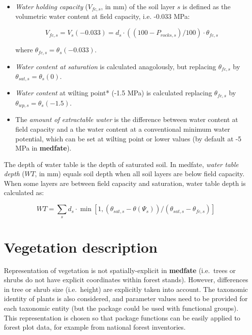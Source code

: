 \documentclass[]{book}
\providecommand{\tightlist}{%
  \setlength{\itemsep}{0pt}\setlength{\parskip}{0pt}}
\begin{document}
\begin{itemize}
\tightlist
\item
  \emph{Water holding capacity} (\(V_{fc, s}\), in mm) of the soil layer
  \(s\) is defined as the volumetric water content at field capacity,
  i.e. -0.033 MPa:

  \begin{equation}
  V_{fc,s} = V_{s}(-0.033) = d_s\cdot ((100-P_{rocks,s})/100)\cdot\theta_{fc,s}
  \end{equation}

  where \(\theta_{fc,s} = \theta_s(-0.033)\).
\item
  \emph{Water content at saturation} is calculated anagolously, but
  replacing \(\theta_{fc,s}\) by \(\theta_{sat, s} = \theta_s(0)\).
\item
  \emph{Water content }at wilting point* (-1.5 MPa) is calculated
  replacing \(\theta_{fc,s}\) by \(\theta_{wp,s} = \theta_s(-1.5)\).
\item
  The \emph{amount of extractable water} is the difference between water
  content at field capacity and a the water content at a conventional
  minimum water potential, which can be set at wilting point or lower
  values (by default at -5 MPa in \textbf{medfate}).
\end{itemize}

The depth of water table is the depth of saturated soil. In medfate,
\emph{water table depth} (\(WT\), in mm) equals soil depth when all soil
layers are below field capacity. When some layers are between field
capacity and saturation, water table depth is calculated as:

\begin{equation}
WT = \sum_{s}{d_s \cdot \min\left[1,(\theta_{sat,s} - \theta(\Psi_s))/(\theta_{sat,s}-\theta_{fc,s})\right]}
\end{equation}

\section{Vegetation description}\label{vegetation-description}

Representation of vegetation is not spatially-explicit in
\textbf{medfate} (i.e.~trees or shrubs do not have explicit coordinates
within forest stands). However, differences in tree or shrub size
(i.e.~height) are explicitly taken into account. The taxonomic identity
of plants is also considered, and parameter values need to be provided
for each taxonomic entity (but the package could be used with functional
groups). This representation is chosen so that package functions can be
easily applied to forest plot data, for example from national forest
inventories.
\end{document}
